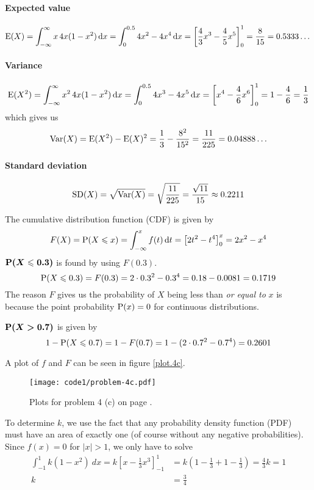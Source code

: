 \documentclass[a4paper,english,12pt]{article}
\begin{document}
\paragraph{Expected value}
\[
  \mathrm{E}(X)
    = \int_{-\infty}^{\infty} x\,4x(1-x^2)\, \mathrm{d} x
    = \int_{0}^{0.5} 4x^2 - 4x^4 \, \mathrm{d} x
    = \left[ \frac{4}{3}x^3 - \frac{4}{5}x^5 \right]_{0}^{1}
    = \frac{8}{15} = 0.5333\dots
\]
\paragraph{Variance}
\begin{align*}
  \mathrm{E}(X^2)
    = \int_{-\infty}^{\infty} x^2\,4x(1-x^2)\, \mathrm{d} x
    = \int_{0}^{0.5} 4x^3 - 4x^5 \, \mathrm{d} x
    = \left[ x^4 - \frac{4}{6}x^6 \right]_{0}^{1}
    = 1 - \frac{4}{6} = \frac{1}{3}
\end{align*}
which gives us
\begin{align*}
  \mathrm{Var}(X) = \mathrm{E}(X^2) - \mathrm{E}(X)^2 = \frac{1}{3} - \frac{8^2}{15^2} =
    \frac{11}{225} = 0.04888\dots
\end{align*}
\paragraph{Standard deviation}\[
  \mathrm{SD}(X) = \sqrt{\mathrm{Var}(X)} = \sqrt{\frac{11}{225}} = \frac{\sqrt{11}}{15}
  \approx 0.2211
\]

The cumulative distribution function (CDF) is given by
\[
  F(X) = \mathrm{P}(X \leqslant x) = \int_{-\infty}^{x} f(t)\, \mathrm{d}t
    = \left[ 2t^2 - t^4 \right]_{0}^{x} = 2x^2 - x^4
\]
$\boldsymbol{\mathrm{P}(X \leqslant 0.3)}$ is found by using $F(0.3)$.
\[
  \mathrm{P}(X \leqslant 0.3) = F(0.3) = 2\cdot0.3^2 - 0.3^4 = 0.18 - 0.0081 = 0.1719
\]
The reason $F$ gives us the probability of $X$ being less than \textit{or equal
to} $x$ is because the point probability $\mathrm{P}(x) = 0$ for continuous
distributions.

$\boldsymbol{\mathrm{P}(X > 0.7)}$ is given by
\[
  1 - \mathrm{P}(X \leqslant 0.7) = 1 - F(0.7)
    = 1 - (2\cdot 0.7^2 - 0.7^4) = 0.2601
\]

A plot of $f$ and $F$ can be seen in figure \vref{plot.4c}.
  \begin{figure}[H]
  \texttt{[image: code1/problem-4c.pdf]}
  \caption{Plots for problem 4 (c) on page \pageref{problem.4 (c)}.}
  \label{plot.4c}
\end{figure}

To determine $k$, we use the fact that any probability density function (PDF)
must have an area of exactly one (of course without any negative
probabilities). Since $f(x) = 0$ for $|x| > 1$, we only have to solve
\begin{align*}
  \int_{-1}^{1}{k(1-x^2)~dx} =
  k\left[ x - \frac{1}{3}{x^3} \right]_{-1}^{1} &=
  k\left( 1 - \frac{1}{3} + 1 - \frac{1}{3} \right) = \frac{4}{3}k = 1 \\
   k &= \frac{3}{4}
\end{align*}
\end{document}
